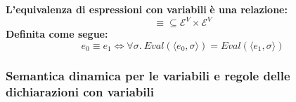 \documentclass[a4paper]{article}
\begin{document}
 	\begin{boxdef}
 		\textbf{L'}\textcolor{Red3}{\textbf{equivalenza di espressioni con variabili}} \textbf{è una relazione:}
 		\begin{equation*}
 			\equiv \subseteq \mathcal{E}^{V} \times \mathcal{E}^{V}
 		\end{equation*}
 		\textbf{Definita come segue:}
 		\begin{equation*}
 			e_{0} \equiv e_{1} \iff \forall \sigma. \: Eval\left(\langle e_{0},\sigma \rangle\right) = Eval\left( \langle e_{1},\sigma \rangle \right)
 		\end{equation*}
 	\end{boxdef}\newpage
 	
 	\subsubsection{Semantica dinamica per le variabili e regole delle dichiarazioni con variabili}
 	
\end{document}

